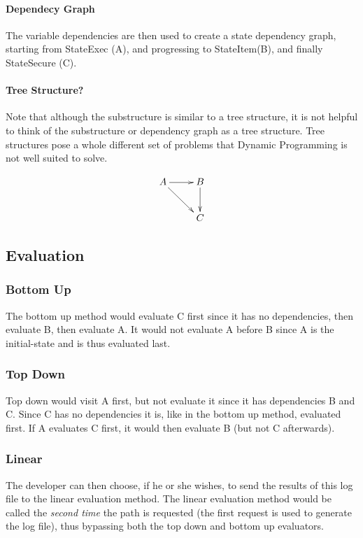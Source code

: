 \documentclass[11pt,twocolumn]{article}
\begin{document}
\paragraph{Dependecy Graph}
The variable dependencies are then used to create a state dependency graph, starting from StateExec (A), and progressing to StateItem(B), and finally StateSecure (C).
\paragraph{Tree Structure?}
Note that although the substructure is similar to a tree structure, it is not helpful to think of the substructure or dependency graph as a tree structure. Tree structures pose a whole different set of problems that Dynamic Programming is not well suited to solve.

\begin{displaymath}
    \xymatrix{
        A \ar[dr] \ar[r] & B \ar[d] \\
                               & C }
\end{displaymath}

\subsection{Evaluation}
\subsubsection{Bottom Up}
The bottom up method would evaluate C first since it has no dependencies, then evaluate B, then evaluate A. It would not evaluate A before B since A is the initial-state and is thus evaluated last.
\subsubsection{Top Down}
Top down would visit A first, but not evaluate it since it has dependencies B and C. Since C has no dependencies it is, like in the bottom up method, evaluated first. If A evaluates C first, it would then evaluate B (but not C afterwards).
\subsubsection{Linear}
The developer can then choose, if he or she wishes, to send the results of this log file to the linear evaluation method. The linear evaluation method would be called the \emph{second time} the path is requested (the first request is used to generate the log file), thus bypassing both the top down and bottom up evaluators.
\end{document}
